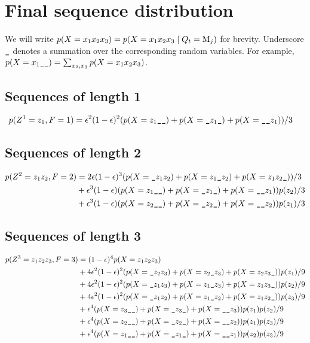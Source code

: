 \section{Final sequence distribution}

We will write $p(X=x_1x_2x_3) = p(X=x_1x_2x_3 \;|\; Q_t = \mathrm M_j)$ for brevity.
Underscore $\s$ denotes a summation over the corresponding random variables.
For example, $p(X=x_1\s\s)=\sum_{x_2,x_3}p(X=x_1x_2x_3)$.

\subsection{Sequences of length 1}

\begin{align*}
    p(Z^1=z_1,F=1)
        &= \eps^2(1-\eps)^2(p(X=z_1\s\s) + p(X=\s z_1\s) + p(X=\s\s z_1)) / 3
\end{align*}

\subsection{Sequences of length 2}

\begin{align*}
    p(Z^2=z_1z_2,F=2)
        &= 2\eps(1-\eps)^3(p(X=\s z_1z_2) + p(X=z_1\s z_2) + p(X=z_1z_2\s))/3\\
        &+ \eps^3(1-\eps)(p(X=z_1\s\s) + p(X=\s z_1\s) + p(X=\s\s z_1))p(z_2)/3\\
        &+ \eps^3(1-\eps)(p(X=z_2\s\s) + p(X=\s z_2\s) + p(X=\s\s z_2))p(z_1)/3
\end{align*}

\subsection{Sequences of length 3}

\begin{align*}
    p(Z^3=z_1z_2z_3,F=3) &= (1-\eps)^4 p(X=z_1z_2z_3)\\
        &+ 4\eps^2(1-\eps)^2 (p(X=\s z_2 z_3) + p(X=z_2\s z_3) + p(X=z_2 z_3\s))p(z_1)/9\\
        &+ 4\eps^2(1-\eps)^2 (p(X=\s z_1 z_3) + p(X=z_1\s z_3) + p(X=z_1 z_3\s))p(z_2)/9\\
        &+ 4\eps^2(1-\eps)^2 (p(X=\s z_1 z_2) + p(X=z_1\s z_2) + p(X=z_1 z_2\s))p(z_3)/9\\
        &+ \eps^4 (p(X=z_3\s\s) + p(X=\s z_3\s) + p(X=\s\s z_3))p(z_1)p(z_2)/9\\
        &+ \eps^4 (p(X=z_2\s\s) + p(X=\s z_2\s) + p(X=\s\s z_2))p(z_1)p(z_3)/9\\
        &+ \eps^4 (p(X=z_1\s\s) + p(X=\s z_1\s) + p(X=\s\s z_1))p(z_2)p(z_3)/9
\end{align*}

